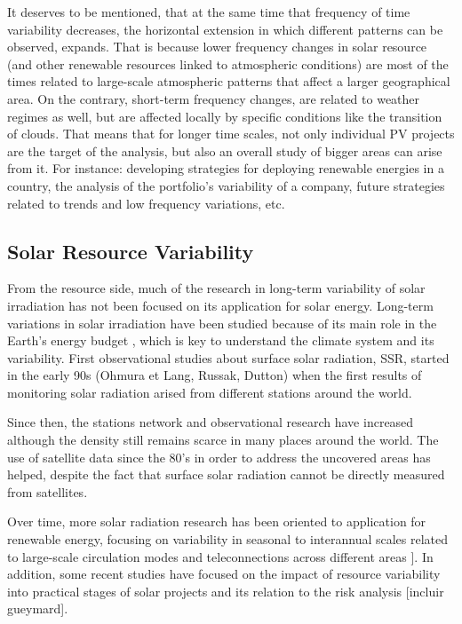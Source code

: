 It deserves to be mentioned, that at the same time that frequency of time variability decreases, the horizontal extension in which different patterns can be observed, expands. That is because lower frequency changes in solar resource (and other renewable resources linked to atmospheric conditions) are most of the times related to large-scale atmospheric patterns that affect a larger geographical area. On the contrary, short-term frequency changes, are related to weather regimes as well, but are affected locally by specific conditions like the transition of clouds. That means that for longer time scales, not only individual PV projects are the target of the analysis, but also an overall study of bigger areas can arise from it. For instance: developing strategies for deploying renewable energies in a country, the analysis of the portfolio's variability of a company, future strategies related to trends and low frequency variations, etc. 
  
\subsection{Solar Resource Variability}

From the resource side, much of the research in long-term variability of solar irradiation has not been focused on its application for solar energy. Long-term variations in solar irradiation have been studied because of its main role in the Earth's energy budget \cite*{Wild2012}, which is key to understand the climate system and its variability. First observational studies about surface solar radiation, SSR, started in the early 90s (Ohmura et Lang, Russak, Dutton) when the first results of monitoring solar radiation arised from different stations around the world.

Since then, the stations network and observational research have increased although the density still remains scarce in many places around the world. The use of satellite data since the 80's in order to address the uncovered areas has helped, despite the fact that surface solar radiation cannot be directly measured from satellites.  

Over time, more solar radiation research has been oriented to application for renewable energy, focusing on variability in seasonal to interannual scales related to large-scale circulation modes and teleconnections across different areas \cite*{Davy2012, Jerez2013, Jerez2013a}].  In addition, some recent studies have focused on the impact of resource variability into practical stages of solar projects and its relation to the risk analysis \cite*{Bryce2018} [incluir gueymard].

